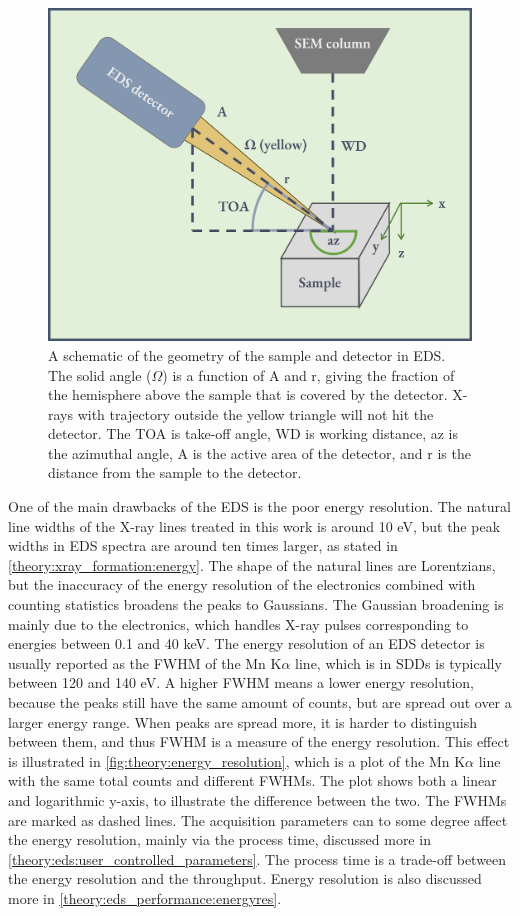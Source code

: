 \begin{figure}[ht]
    \centering
    \includegraphics[width=0.6\linewidth]{figures/EDS_geometry.png}
    \caption{
        A schematic of the geometry of the sample and detector in EDS.
        The solid angle ($\Omega$) is a function of A and r, giving the fraction of the hemisphere above the sample that is covered by the detector.
        X-rays with trajectory outside the yellow triangle will not hit the detector.
        The TOA is take-off angle, WD is working distance, az is the azimuthal angle, A is the active area of the detector, and r is the distance from the sample to the detector.
    }
    \label{fig:eds_geometry}
\end{figure}






One of the main drawbacks of the EDS is the poor energy resolution. %
The natural line widths of the X-ray lines treated in this work is around 10 eV, but the peak widths in EDS spectra are around ten times larger, as stated in \cref{theory:xray_formation:energy}.
The shape of the natural lines are Lorentzians, but the inaccuracy of the energy resolution of the electronics combined with counting statistics broadens the peaks to Gaussians.
The Gaussian broadening is mainly due to the electronics, which handles X-ray pulses corresponding to energies between 0.1 and 40 keV.
The energy resolution of an EDS detector is usually reported as the FWHM of the Mn K$\alpha$ line, which is in SDDs is typically between 120 and 140 eV.
A higher FWHM means a lower energy resolution, because the peaks still have the same amount of counts, but are spread out over a larger energy range.
When peaks are spread more, it is harder to distinguish between them, and thus FWHM is a measure of the energy resolution.
This effect is illustrated in \cref{fig:theory:energy_resolution}, which is a plot of the Mn K$\alpha$ line with the same total counts and different FWHMs.
The plot shows both a linear and logarithmic y-axis, to illustrate the difference between the two.
The FWHMs are marked as dashed lines.
The acquisition parameters can to some degree affect the energy resolution, mainly via the process time, discussed more in \cref{theory:eds:user_controlled_parameters}.
The process time is a trade-off between the energy resolution and the throughput.
Energy resolution is also discussed more in \cref{theory:eds_performance:energyres}.



